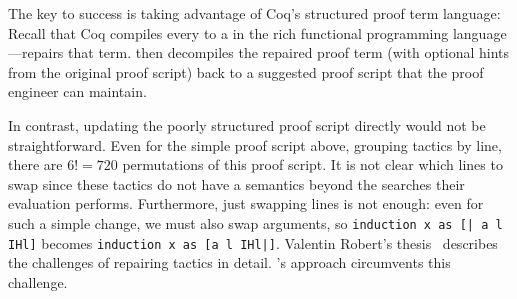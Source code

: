The key to success is taking advantage of Coq's structured proof term language:
Recall that Coq compiles every  to a  in the rich functional programming language
---\toolnamec repairs that term.
\toolnamec then decompiles the repaired proof term (with optional hints from the original proof script) back 
to a suggested proof script that the proof engineer can maintain.

In contrast, updating the poorly structured proof script directly would not be straightforward.
Even for the simple proof script above, grouping tactics by line, there are $6! = 720$ permutations of this proof script.
It is not clear which lines to swap since these tactics do not have a semantics beyond the searches their evaluation performs.
Furthermore, just swapping lines is not enough: even for such a simple change, we must also swap
arguments, so \lstinline{induction x as [| a l IHl]} becomes \lstinline{induction x as [a l IHl|]}.
Valentin Robert's thesis~\cite{robert2018} describes the challenges of repairing tactics in detail.
\toolnamec's approach circumvents this challenge.



